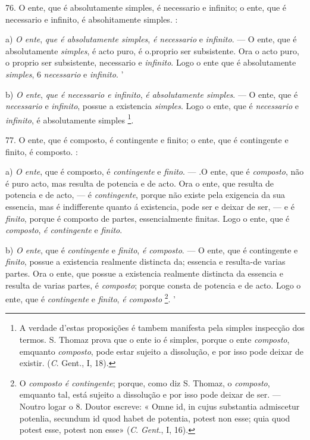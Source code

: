 76. O ente, que é absolutamente simples, é necessario e infinito; o ente, que é necessario e infinito, é absohitamente simples. :

a) \emph{O ente}, \emph{que é absolutamente simples}, \emph{é necessario} e \emph{infinito}. --- O ente, que é absolutamente \emph{simples}, é acto puro, é o.proprio ser subsistente. Ora o acto puro, o proprio ser subsistente, necessario e \emph{infinito}. Logo o ente que é absolutamente \emph{simples}, \textbar{} 6 \emph{necessario} e \emph{infinito}. '

b) \emph{O ente}, \emph{que é necessario e infinito}, \emph{é absolutamente simples}. --- O ente, que é \emph{necessario} e \emph{infinito}, possue a existencia  \emph{simples}. Logo o ente, que é \emph{necessario} e \emph{infinito}, é absolutamente simples \footnote{A verdade d'estas proposições é tambem manifesta pela simples inspecção dos termos. S. Thomaz prova que o ente io é simples, porque o ente \emph{composto}, emquanto \emph{composto}, pode estar sujeito a dissolução, e por isso pode deixar de existir. (\emph{C}. Gent., I, 18).}.

77. O ente, que é composto, é contingente e finito; o ente, que é contingente e finito, é composto. :

a) \emph{O ente}, que é composto, é \emph{contingente} e \emph{finito}. --- .O ente, que é \emph{composto}, não é puro acto, mas resulta de potencia e de acto. Ora o ente, que resulta de potencia e de acto, --- é \emph{contingente}, porque não existe pela exigencia da sua essencia, mas é indifferente quanto á existencia, pode ser e deixar de ser, --- e é \emph{finito}, porque é composto de partes, essencialmente finitas. Logo o ente, que é \emph{composto}, \emph{é contingente} e \emph{finito}.

b) \emph{O ente}, que é \emph{contingente} e \emph{finito}, \emph{é composto}. --- O ente, que é contingente e \emph{finito}, possue a existencia realmente distincta da; essencia e resulta-de varias partes. Ora o ente, que possue a existencia realmente distincta da essencia e resulta de varias partes, é \emph{composto}; porque consta de potencia e de acto. Logo o ente, que é \emph{contingente} e \emph{finito}, \emph{é composto} \footnote{O \emph{composto é contingente}; porque, como diz S. Thomaz, o \emph{composto}, emquanto tal, está sujeito a dissolução e por isso pode deixar de ser. --- Noutro logar o 8. Doutor escreve: « Omne id, in cujus substantia admiscetur potenlia, secundum id quod habet de potentia, potest non esse; quia quod potest esse, potest non esse» (\emph{C}. \emph{Gent}., I, 16).}. '

